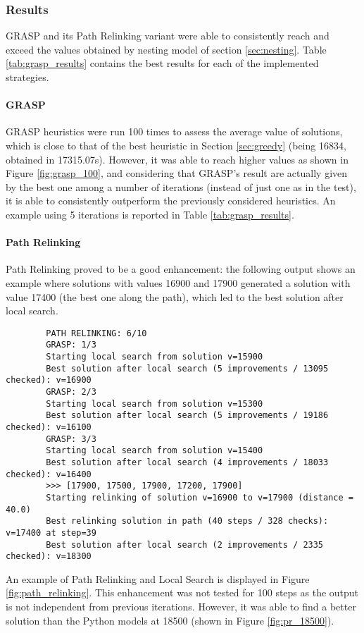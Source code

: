 \subsubsection{Results}
GRASP and its Path Relinking variant were able to consistently reach and exceed the values obtained by nesting model of section \ref{sec:nesting}. Table \ref{tab:grasp_results} contains the best results for each of the implemented strategies.

\paragraph{GRASP} GRASP heuristics were run 100 times to assess the average value of solutions, which is close to that of the best heuristic in Section \ref{sec:greedy} (being 16834, obtained in 17315.07s). However, it was able to reach higher values as shown in Figure \ref{fig:grasp_100}, and considering that GRASP's result are actually given by the best one among a number of iterations (instead of just one as in the test), it is able to consistently outperform the previously considered heuristics. An example using 5 iterations is reported in Table \ref{tab:grasp_results}.

\paragraph{Path Relinking} Path Relinking proved to be a good enhancement: the following output shows an example where solutions with values 16900 and 17900 generated a solution with value 17400 (the best one along the path), which led to the best solution after local search.

\begin{footnotesize}
	\begin{verbatim}
		PATH RELINKING: 6/10
		GRASP: 1/3
		Starting local search from solution v=15900
		Best solution after local search (5 improvements / 13095 checked): v=16900
		GRASP: 2/3
		Starting local search from solution v=15300
		Best solution after local search (5 improvements / 19186 checked): v=16100
		GRASP: 3/3
		Starting local search from solution v=15400
		Best solution after local search (4 improvements / 18033 checked): v=16400
		>>> [17900, 17500, 17900, 17200, 17900]
		Starting relinking of solution v=16900 to v=17900 (distance = 40.0)
		Best relinking solution in path (40 steps / 328 checks): v=17400 at step=39
		Best solution after local search (2 improvements / 2335 checked): v=18300
	\end{verbatim}
\end{footnotesize}
An example of Path Relinking and Local Search is displayed in Figure \ref{fig:path_relinking}. This enhancement was not tested for 100 steps as the output is not independent from previous iterations. However, it was able to find a better solution than the Python models at 18500 (shown in Figure \ref{fig:pr_18500}). 

